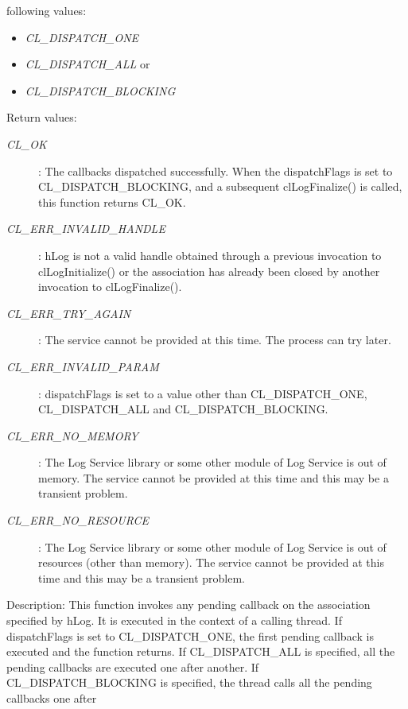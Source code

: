 \begin{flushleft}
\begin{Desc}
\begin{description}
following values: 
\begin{itemize}
\item
\textit{CL\_\-DISPATCH\_\-ONE}
\item
\textit{CL\_\-DISPATCH\_\-ALL} or 
\item
\textit{CL\_\-DISPATCH\_\-BLOCKING}
\end{itemize}
\end{description}
\end{Desc}
\begin{Desc}
\item[Return values:]
\begin{description}
\item[{\em CL\_\-OK}]: The callbacks dispatched successfully. When the dispatchFlags is set to CL\_\-DISPATCH\_\-BLOCKING, and a subsequent
clLogFinalize() is called, this function returns CL\_\-OK.
\item[{\em CL\_\-ERR\_\-INVALID\_\-HANDLE}]: hLog is not a valid handle obtained through a previous invocation to 
clLogInitialize() or the association has already been closed by another invocation to clLogFinalize().
\item[{\em CL\_\-ERR\_\-TRY\_\-AGAIN}]: The service cannot be provided at this time. The process can try later.
\item[{\em CL\_\-ERR\_\-INVALID\_\-PARAM}]: dispatchFlags is set to a value other than CL\_\-DISPATCH\_\-ONE, CL\_\-DISPATCH\_\-ALL and 
CL\_\-DISPATCH\_\-BLOCKING.
\item[{\em CL\_\-ERR\_\-NO\_\-MEMORY}]: The Log Service library or some other module of Log Service is out of memory. The service cannot 
be provided at this time and this may be a transient problem.
\item[{\em CL\_\-ERR\_\-NO\_\-RESOURCE}]: The Log Service library or some other module of Log Service is out of resources 
(other than memory). The service cannot be provided at this time and this may be a transient problem.
\end{description}
\end{Desc}
\begin{Desc}
\item[Description:] This function invokes any pending callback on the association specified by hLog. It is executed in the context of a calling thread.
If dispatchFlags is set to CL\_\-DISPATCH\_\-ONE, the first pending callback is executed and the function returns. If CL\_\-DISPATCH\_\-ALL is specified, 
all the
pending callbacks are executed one after another. If CL\_\-DISPATCH\_\-BLOCKING is specified, the thread calls all the pending callbacks one after

\end{Desc}
\end{flushleft}
